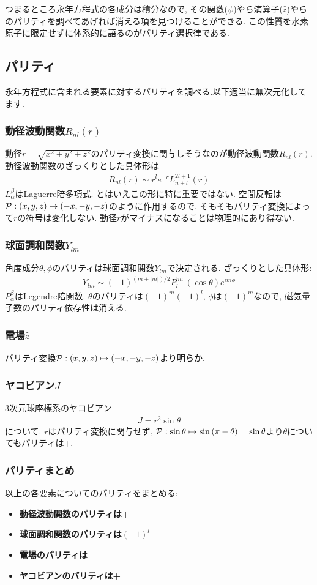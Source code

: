\documentclass[10.5pt,a4paper]{jreport}
\begin{document}
つまるところ永年方程式の各成分は積分なので, その関数($\psi$)やら演算子($\hat{z}$)やらのパリティを調べてあげれば消える項を見つけることができる. この性質を水素原子に限定せずに体系的に語るのがパリティ選択律である.
\subsection{パリティ}
永年方程式に含まれる要素に対するパリティを調べる.以下適当に無次元化してます.
\subsubsection{動径波動関数$R_{nl}(r)$}
動径$r = \sqrt{x^2 + y^2 + z^2}$のパリティ変換に関与しそうなのが動径波動関数$R_{nl}(r)$. 動径波動関数のざっくりとした具体形は
\begin{eqnarray}
  R_{nl}(r) \sim r^le^{-r}L_{n+l}^{2l+1}(r)
\end{eqnarray}
$L_\alpha^\beta$はLaguerre陪多項式. とはいえこの形に特に重要ではない. 空間反転は${\cal P}:(x, y, z)\mapsto (-x, -y, -z)$のように作用するので, そもそもパリティ変換によって$r$の符号は変化しない. 動径$r$がマイナスになることは物理的にあり得ない.\\
\subsubsection{球面調和関数$Y_{lm}$}
角度成分$\theta, \phi$のパリティは球面調和関数$Y_{lm}$で決定される. ざっくりとした具体形:
\begin{eqnarray}
  Y_{lm} \sim (-1)^{(m+|m|)/2}P_l^{|m|}(\cos{\theta})e^{im\phi}
\end{eqnarray}
$P_\alpha^\beta$はLegendre陪関数. $\theta$のパリティは$(-1)^m(-1)^l$, $\phi$は$(-1)^m$なので, 磁気量子数のパリティ依存性は消える.
\subsubsection{電場$\hat{z}$}
パリティ変換${\cal P}:(x, y, z)\mapsto(-x, -y, -z)$より明らか.
\subsubsection{ヤコビアン$J$}
3次元球座標系のヤコビアン
\begin{eqnarray}
  J = r^2\sin{\theta}
\end{eqnarray}
について. $r$はパリティ変換に関与せず, ${\cal P}:\sin{\theta} \mapsto \sin{(\pi - \theta)} = \sin{\theta}$より$\theta$についてもパリティは+.
\subsubsection{パリティまとめ}
以上の各要素についてのパリティをまとめる:
\begin{itemize}
  \item \textbf{動径波動関数のパリティは+}
  
  \item \textbf{球面調和関数のパリティは$(-1)^l$}
  
  \item \textbf{電場のパリティは$-$}
  
  \item \textbf{ヤコビアンのパリティは+}
\end{itemize}
\end{document}
